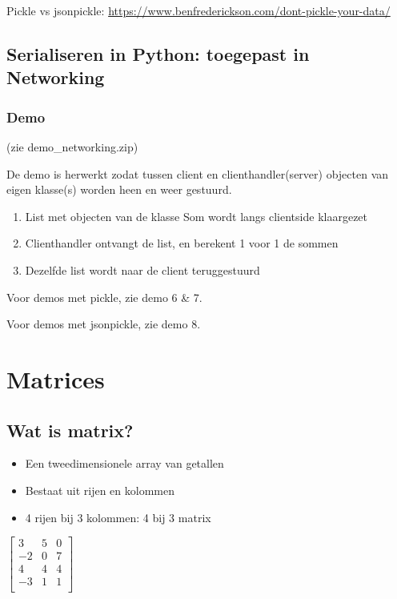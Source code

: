 \documentclass{article}
\begin{document}
Pickle vs jsonpickle: \url{https://www.benfrederickson.com/dont-pickle-your-data/}

\subsection{Serialiseren in Python: toegepast in Networking}

\subsubsection{Demo}

(zie demo\_networking.zip)

De demo is herwerkt zodat tussen client en clienthandler(server) objecten van 
eigen klasse(s) worden heen en weer gestuurd. 

\begin{enumerate}
    \item List met objecten van de klasse Som wordt langs clientside klaargezet
    \item Clienthandler ontvangt de list, en berekent 1 voor 1 de sommen
    \item Dezelfde list wordt naar de client teruggestuurd
\end{enumerate}

Voor demos met pickle, zie demo 6 \& 7.

Voor demos met jsonpickle, zie demo 8.

\section{Matrices}

\subsection{Wat is matrix?}

\begin{itemize}
    \item Een tweedimensionele array van getallen
    \item Bestaat uit rijen en kolommen
    \item 4 rijen bij 3 kolommen: 4 bij 3 matrix
\end{itemize}

$\begin{bmatrix}
    3 & 5 & 0\\
    -2 & 0 & 7\\
    4 & 4 & 4\\
    -3 & 1 & 1\\
\end{bmatrix}$
\end{document}

